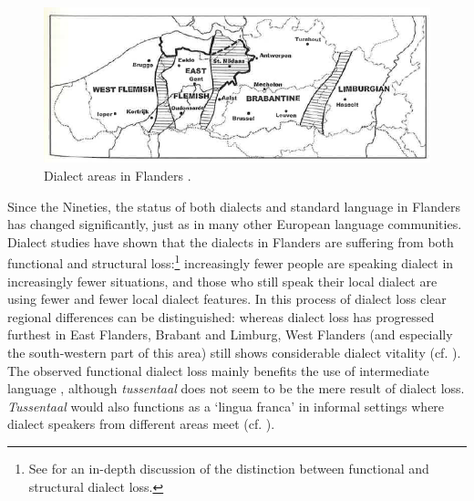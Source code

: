 \documentclass[output=paper]{LSP/langsci}
\begin{document}
\begin{figure}
\includegraphics[width=\textwidth]{illustrations/ghys_fig1.png}
\caption{Dialect areas in Flanders \citep[359]{taeldeman_linguistic_2009}.}
\end{figure}

Since the Nineties, the status of both dialects and standard language in Flanders has changed significantly, just as in many other European language communities. Dialect studies have shown that the dialects in Flanders are suffering from both functional \citep{ghyselen_dialectcompetentie_2014} and structural \citep{heeringa_convergence_2014,vandekerckhove_structurele_2000} loss:\footnote{See \citet{ghyselen_dialectcompetentie_2014} for an in-depth discussion of the distinction between functional and structural dialect loss.} increasingly fewer people are speaking dialect in increasingly fewer situations, and those who still speak their local dialect are using fewer and fewer local dialect features. In this process of dialect loss clear regional differences can be distinguished: whereas dialect loss has progressed furthest in East Flanders, Brabant and Limburg, West Flanders (and especially the south-western part of this area) still shows considerable dialect vitality (cf. \citealt{ghyselen_dialectcompetentie_2014}). The observed functional dialect loss mainly benefits the use of intermediate language \citep{de_caluwe_tussentaal_2006}, although \textit{tussentaal} does not seem to be the mere result of dialect loss. \textit{Tussentaal} would also functions as a ‘lingua franca’ in informal settings where dialect speakers from different areas meet (cf. \citealt{gabel_taalaccommodatie_2010}). 
\end{document}
